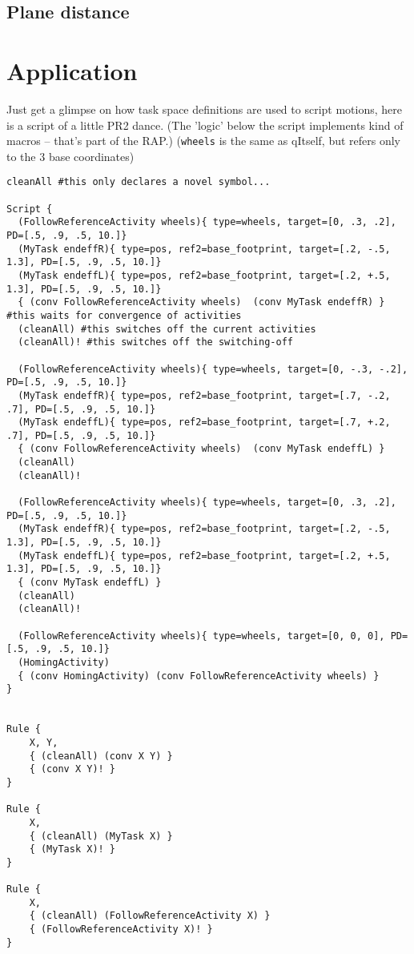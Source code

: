 \documentclass[10pt,fleqn,twoside]{article}
\begin{document}
\subsection{Plane distance}

\section{Application}

Just get a glimpse on how task space definitions are used to script
motions, here is a script of a little PR2 dance. (The 'logic' below
the script implements kind of macros -- that's part of the RAP.)
(\texttt{wheels} is the same as qItself, but refers only to the 3 base coordinates)

\begin{shaded}
\begin{Verbatim}[fontfamily=courier,fontsize=\tiny]
cleanAll #this only declares a novel symbol...

Script {
  (FollowReferenceActivity wheels){ type=wheels, target=[0, .3, .2], PD=[.5, .9, .5, 10.]}
  (MyTask endeffR){ type=pos, ref2=base_footprint, target=[.2, -.5, 1.3], PD=[.5, .9, .5, 10.]}
  (MyTask endeffL){ type=pos, ref2=base_footprint, target=[.2, +.5, 1.3], PD=[.5, .9, .5, 10.]}
  { (conv FollowReferenceActivity wheels)  (conv MyTask endeffR) }  #this waits for convergence of activities
  (cleanAll) #this switches off the current activities
  (cleanAll)! #this switches off the switching-off

  (FollowReferenceActivity wheels){ type=wheels, target=[0, -.3, -.2], PD=[.5, .9, .5, 10.]}
  (MyTask endeffR){ type=pos, ref2=base_footprint, target=[.7, -.2, .7], PD=[.5, .9, .5, 10.]}
  (MyTask endeffL){ type=pos, ref2=base_footprint, target=[.7, +.2, .7], PD=[.5, .9, .5, 10.]}
  { (conv FollowReferenceActivity wheels)  (conv MyTask endeffL) }
  (cleanAll)
  (cleanAll)!

  (FollowReferenceActivity wheels){ type=wheels, target=[0, .3, .2], PD=[.5, .9, .5, 10.]}
  (MyTask endeffR){ type=pos, ref2=base_footprint, target=[.2, -.5, 1.3], PD=[.5, .9, .5, 10.]}
  (MyTask endeffL){ type=pos, ref2=base_footprint, target=[.2, +.5, 1.3], PD=[.5, .9, .5, 10.]}
  { (conv MyTask endeffL) }
  (cleanAll)
  (cleanAll)!

  (FollowReferenceActivity wheels){ type=wheels, target=[0, 0, 0], PD=[.5, .9, .5, 10.]}
  (HomingActivity)
  { (conv HomingActivity) (conv FollowReferenceActivity wheels) }
}


Rule {
    X, Y, 
    { (cleanAll) (conv X Y) }
    { (conv X Y)! }
}

Rule {
    X, 
    { (cleanAll) (MyTask X) }
    { (MyTask X)! }
}

Rule {
    X, 
    { (cleanAll) (FollowReferenceActivity X) }
    { (FollowReferenceActivity X)! }
}
\end{Verbatim}
\end{shaded}
\end{document}
